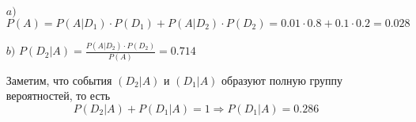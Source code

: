 \documentclass[a4paper, 10pt]{article}
\begin{document}
\begin{enumerate}
    \item[$a)$] $P(A)=P(A|D_1)\cdot P(D_1)+P(A|D_2)\cdot P(D_2)=0.01\cdot0.8+0.1\cdot0.2=0.028$
    \item[$b)$] $P(D_2|A)=\displaystyle\frac{P(A|D_2)\cdot P(D_2)}{P(A)}=0.714$

    Заметим, что события $(D_2|A)$ и $(D_1|A)$ образуют полную группу вероятностей, то есть $$P(D_2|A)+P(D_1|A)=1\Longrightarrow P(D_1|A)=0.286$$
\end{enumerate}
\end{document}
